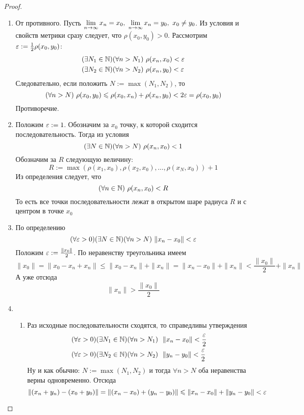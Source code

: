 \begin{proof}~
	\begin{enumerate}
		\item От противного. Пусть $\liml_{n \to \infty}
			x_n = x_0,\ \liml_{n \to \infty} x_n = y_0,\ 
			x_0 \neq y_0$. Из условия и свойств метрики сразу следует,
			что $\rho(x_0, y_0) > 0$. Рассмотрим
			$\varepsilon := \frac{1}{2}\rho(x_0, y_0)$:
			\begin{align*}
				&(\exists N_1 \in \N)(\forall n > N_1)
				\ \rho(x_n, x_0) < \eps
				\\
				&(\exists N_2 \in \N)(\forall n > N_2)\ 
				\rho(x_n, y_0) < \eps
			\end{align*}
			Следовательно, если положить $N := \max(N_1, N_2)$, то
			\[
				(\forall n > N)\ \rho(x_0, y_0) \leqslant \rho(x_0, x_n) + \rho(x_n, y_0) < 2\varepsilon = \rho(x_0, y_0)
			\]
			Противоречие.
		
		\item Положим $\varepsilon := 1$. Обозначим за $x_0$ точку,
			к которой сходится последовательность. Тогда из условия
			\[
				(\exists N \in \N)(\forall n > N)\ 
				\rho(x_n, x_0) < 1
			\]
			Обозначим за $R$ следующую величину:
			\[
				R := \max(\rho(x_1, x_0), \rho(x_2, x_0),
				\ldots, \rho(x_N, x_0)) + 1
			\]
			Из определения следует, что
			\[
				(\forall n \in \mathbb{N})\ \rho(x_n, x_0) < R
			\]
			То есть все точки последовательности лежат
			в открытом шаре радиуса $R$ и с центром в точке $x_0$
		
		\item По определению
			\[
				(\forall \varepsilon > 0)(\exists N \in \mathbb{N})
				(\forall n > N)\ \|x_n - x_0\| < \varepsilon
			\]
			Положим $\varepsilon := \frac{\|x_0\|}{2}$. По
			неравенству треугольника имеем
			\[
				\|x_0\| = \|x_0 - x_n + x_n\| \le
				\|x_0 - x_n\| + \|x_n\| =
				\|x_n - x_0\| + \|x_n\| <
				\frac{\|x_0\|}{2} + \|x_n\|
			\]
			А уже отсюда
			\[
				\|x_n\| > \frac{\|x_0\|}{2}
			\]
		
		\item
		\begin{enumerate}
			\item Раз исходные последовательности сходятся,
			то справедливы утверждения
			\begin{align*}
				&(\forall \varepsilon > 0)(\exists N_1 \in \mathbb{N})
				(\forall n > N_1)\ \ \|x_n - x_0\| < \frac{\varepsilon}{2}
				\\
				&(\forall \varepsilon > 0)(\exists N_2 \in \mathbb{N})
				(\forall n > N_2)\ \ \|y_n - y_0\| < \frac{\varepsilon}{2}
			\end{align*}
			Ну и как обычно: $N := \max(N_1, N_2)$ и тогда
			$\forall n > N$ оба неравенства верны одновременно. Отсюда
			\[
				\|(x_n + y_n) - (x_0 + y_0)\| =
				\|(x_n - x_0) + (y_n - y_0)\| \leqslant
				\|x_n - x_0\| + \|y_n - y_0\| < \varepsilon
			\]
			

\end{enumerate}
\end{enumerate}
\end{proof}
